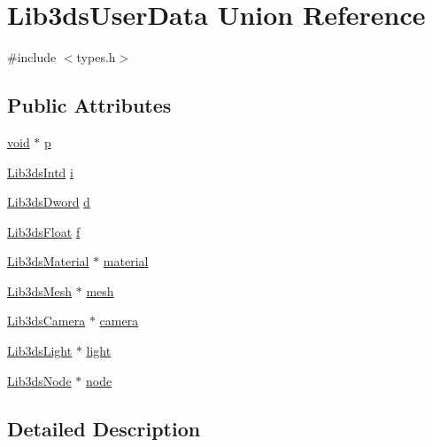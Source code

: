 \hypertarget{union_lib3ds_user_data}{\section{Lib3ds\-User\-Data Union Reference}
\label{union_lib3ds_user_data}
}


{\ttfamily \#include $<$types.\-h$>$}

\subsection*{Public Attributes}
\begin{DoxyCompactItemize}
\item 
\hyperlink{group___u_a_v_objects_plugin_ga444cf2ff3f0ecbe028adce838d373f5c}{void} $\ast$ \hyperlink{union_lib3ds_user_data_a1663b685f1eca998dbc71de58c357e30}{p}
\item 
\hyperlink{types_8h_a5d92ad41149cf040ce2ee32cc2609403}{Lib3ds\-Intd} \hyperlink{union_lib3ds_user_data_a6be97246f4435beffdfcb90f86ebc16e}{i}
\item 
\hyperlink{types_8h_a299c9663303144c562f6bd92c2f273d3}{Lib3ds\-Dword} \hyperlink{union_lib3ds_user_data_a9125862ea8f73e1303c7726b8fff95e8}{d}
\item 
\hyperlink{types_8h_ab18e70f51f9a53c9dee8d930c8e1a7bf}{Lib3ds\-Float} \hyperlink{union_lib3ds_user_data_af710dd2630267bfd3b1b7803f81f42e6}{f}
\item 
\hyperlink{struct_lib3ds_material}{Lib3ds\-Material} $\ast$ \hyperlink{union_lib3ds_user_data_a957522aef55db4407f9cd4c25611d0c4}{material}
\item 
\hyperlink{struct_lib3ds_mesh}{Lib3ds\-Mesh} $\ast$ \hyperlink{union_lib3ds_user_data_ab12c41f932fc657656c095a92e03aa0f}{mesh}
\item 
\hyperlink{struct_lib3ds_camera}{Lib3ds\-Camera} $\ast$ \hyperlink{union_lib3ds_user_data_a13779b6ed8148079744074ca0380b119}{camera}
\item 
\hyperlink{struct_lib3ds_light}{Lib3ds\-Light} $\ast$ \hyperlink{union_lib3ds_user_data_ad4252ec666e1b015f3d8ba38c808652c}{light}
\item 
\hyperlink{struct_lib3ds_node}{Lib3ds\-Node} $\ast$ \hyperlink{union_lib3ds_user_data_af40793194875e5f335a54a64baca85ef}{node}
\end{DoxyCompactItemize}


\subsection{Detailed Description}


